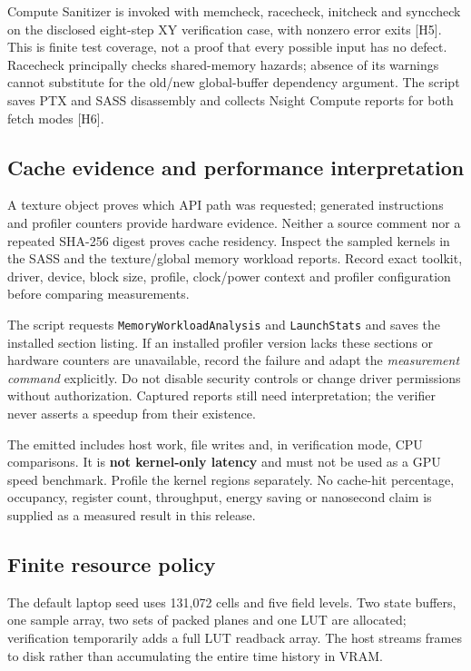 \documentclass[11pt,a4paper]{article}
\begin{document}
Compute Sanitizer is invoked with memcheck, racecheck, initcheck and synccheck on the disclosed eight-step XY verification case, with nonzero error exits {[}H5{]}. This is finite test coverage, not a proof that every possible input has no defect. Racecheck principally checks shared-memory hazards; absence of its warnings cannot substitute for the old/new global-buffer dependency argument. The script saves PTX and SASS disassembly and collects Nsight Compute reports for both fetch modes {[}H6{]}.

\subsection{Cache evidence and performance interpretation}\label{cache-evidence-and-performance-interpretation}

A texture object proves which API path was requested; generated instructions and profiler counters provide hardware evidence. Neither a source comment nor a repeated SHA-256 digest proves cache residency. Inspect the sampled kernels in the SASS and the texture/global memory workload reports. Record exact toolkit, driver, device, block size, profile, clock/power context and profiler configuration before comparing measurements.

The script requests \texttt{MemoryWorkloadAnalysis} and \texttt{LaunchStats} and saves the installed section listing. If an installed profiler version lacks these sections or hardware counters are unavailable, record the failure and adapt the \emph{measurement command} explicitly. Do not disable security controls or change driver permissions without authorization. Captured reports still need interpretation; the verifier never asserts a speedup from their existence.

The emitted  includes host work, file writes and, in verification mode, CPU comparisons. It is \textbf{not kernel-only latency} and must not be used as a GPU speed benchmark. Profile the kernel regions separately. No cache-hit percentage, occupancy, register count, throughput, energy saving or nanosecond claim is supplied as a measured result in this release.

\subsection{Finite resource policy}\label{finite-resource-policy}

The default laptop seed uses 131,072 cells and five field levels. Two state buffers, one sample array, two sets of packed planes and one LUT are allocated; verification temporarily adds a full LUT readback array. The host streams frames to disk rather than accumulating the entire time history in VRAM.
\end{document}
